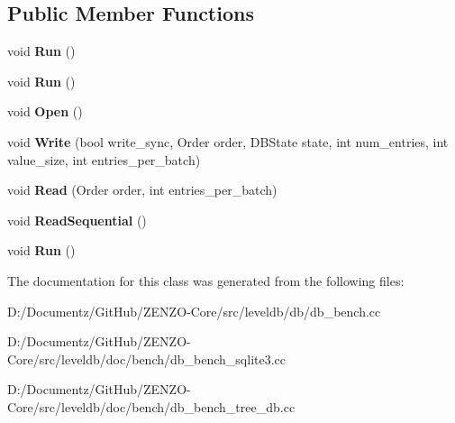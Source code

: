 \subsection*{Public Member Functions}
\begin{DoxyCompactItemize}
\item 
\mbox{\label{classleveldb_1_1_benchmark_a2f262afa0c7d10fcf531fe9657fba490}} 
void {\bfseries Run} ()
\item 
\mbox{\label{classleveldb_1_1_benchmark_a2f262afa0c7d10fcf531fe9657fba490}} 
void {\bfseries Run} ()
\item 
\mbox{\label{classleveldb_1_1_benchmark_a89a3b0da75e6cd2ffb879358e5dd82a6}} 
void {\bfseries Open} ()
\item 
\mbox{\label{classleveldb_1_1_benchmark_a86876b2882d9015610330e69acfdff0d}} 
void {\bfseries Write} (bool write\+\_\+sync, Order order, D\+B\+State state, int num\+\_\+entries, int value\+\_\+size, int entries\+\_\+per\+\_\+batch)
\item 
\mbox{\label{classleveldb_1_1_benchmark_afc9cf258a63488924e172fadc67c12f1}} 
void {\bfseries Read} (Order order, int entries\+\_\+per\+\_\+batch)
\item 
\mbox{\label{classleveldb_1_1_benchmark_a301897d0609459c5e6072db05da6b737}} 
void {\bfseries Read\+Sequential} ()
\item 
\mbox{\label{classleveldb_1_1_benchmark_a2f262afa0c7d10fcf531fe9657fba490}} 
void {\bfseries Run} ()
\end{DoxyCompactItemize}


The documentation for this class was generated from the following files\+:\begin{DoxyCompactItemize}
\item 
D\+:/\+Documentz/\+Git\+Hub/\+Z\+E\+N\+Z\+O-\/\+Core/src/leveldb/db/db\+\_\+bench.\+cc\item 
D\+:/\+Documentz/\+Git\+Hub/\+Z\+E\+N\+Z\+O-\/\+Core/src/leveldb/doc/bench/db\+\_\+bench\+\_\+sqlite3.\+cc\item 
D\+:/\+Documentz/\+Git\+Hub/\+Z\+E\+N\+Z\+O-\/\+Core/src/leveldb/doc/bench/db\+\_\+bench\+\_\+tree\+\_\+db.\+cc\end{DoxyCompactItemize}
